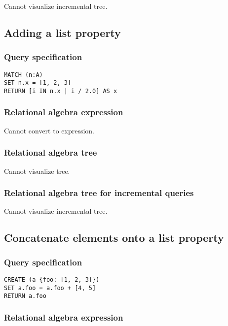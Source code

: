 Cannot visualize incremental tree.

\subsection{Adding a list property}

\subsubsection*{Query specification}

\begin{lstlisting}
MATCH (n:A)
SET n.x = [1, 2, 3]
RETURN [i IN n.x | i / 2.0] AS x
\end{lstlisting}

\subsubsection*{Relational algebra expression}

Cannot convert to expression.

\subsubsection*{Relational algebra tree}

Cannot visualize tree.

\subsubsection*{Relational algebra tree for incremental queries}

Cannot visualize incremental tree.

\subsection{Concatenate elements onto a list property}

\subsubsection*{Query specification}

\begin{lstlisting}
CREATE (a {foo: [1, 2, 3]})
SET a.foo = a.foo + [4, 5]
RETURN a.foo
\end{lstlisting}

\subsubsection*{Relational algebra expression}

